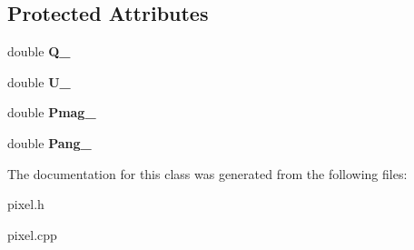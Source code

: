 \subsection*{Protected Attributes}
\begin{DoxyCompactItemize}
\item 
\hypertarget{classTPPixel_a7c655379c173812e1e0c910311164cd8}{
double {\bfseries Q\_\-}}
\label{classTPPixel_a7c655379c173812e1e0c910311164cd8}

\item 
\hypertarget{classTPPixel_ad4ed0b4e9b627e7e1dc0ad2fdbf7e925}{
double {\bfseries U\_\-}}
\label{classTPPixel_ad4ed0b4e9b627e7e1dc0ad2fdbf7e925}

\item 
\hypertarget{classTPPixel_a1a5e29ac4dc30c0dc252bc1ec5e37dcf}{
double {\bfseries Pmag\_\-}}
\label{classTPPixel_a1a5e29ac4dc30c0dc252bc1ec5e37dcf}

\item 
\hypertarget{classTPPixel_a2a39ee945c57e3812a049ac8458c28df}{
double {\bfseries Pang\_\-}}
\label{classTPPixel_a2a39ee945c57e3812a049ac8458c28df}

\end{DoxyCompactItemize}


The documentation for this class was generated from the following files:\begin{DoxyCompactItemize}
\item 
pixel.h\item 
pixel.cpp\end{DoxyCompactItemize}
